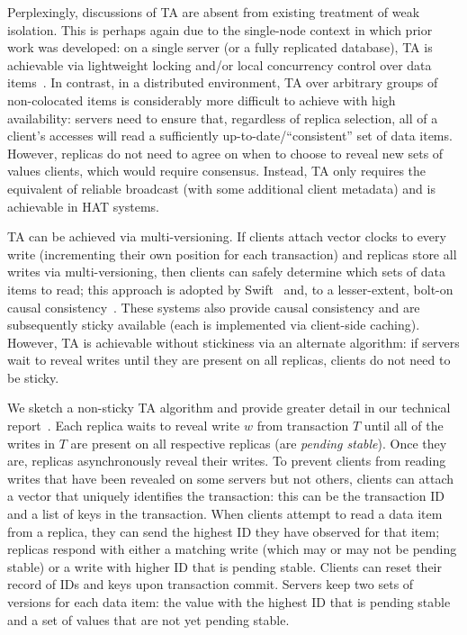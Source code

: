 Perplexingly, discussions of TA are absent from existing treatment of
weak isolation. This is perhaps again due to the single-node context
in which prior work was developed: on a single server (or a fully
replicated database), TA is achievable via lightweight locking and/or
local concurrency control over data items~\cite{gstore}. In contrast,
in a distributed environment, TA over arbitrary groups of
non-colocated items is considerably more difficult to achieve with
high availability: servers need to ensure that, regardless of replica
selection, all of a client's accesses will read a sufficiently
up-to-date/``consistent'' set of data items. However, replicas do not
need to agree on when to choose to reveal new sets of values clients,
which would require consensus. Instead, TA only requires the
equivalent of reliable broadcast (with some additional client
metadata) and is achievable in HAT systems.

TA can be achieved via multi-versioning. If clients attach vector
clocks to every write (incrementing their own position for each
transaction) and replicas store all writes via multi-versioning, then
clients can safely determine which sets of data items to read; this
approach is adopted by Swift~\cite{swift} and, to a lesser-extent,
bolt-on causal consistency~\cite{bolton}. These systems also provide
causal consistency and are subsequently sticky available (each is
implemented via client-side caching). However, TA is achievable
without stickiness via an alternate algorithm: if servers wait to
reveal writes until they are present on all replicas, clients do not
need to be sticky.

We sketch a non-sticky TA algorithm and provide greater detail in our
technical report~\cite{hat-tr}. Each replica waits to reveal write $w$
from transaction $T$ until all of the writes in $T$ are present on all
respective replicas (are \textit{pending stable}). Once they are,
replicas asynchronously reveal their writes. To prevent clients from
reading writes that have been revealed on some servers but not others,
clients can attach a vector that uniquely identifies the transaction:
this can be the transaction ID and a list of keys in the
transaction. When clients attempt to read a data item from a replica,
they can send the highest ID they have observed for that item;
replicas respond with either a matching write (which may or may not be
pending stable) or a write with higher ID that is pending
stable. Clients can reset their record of IDs and keys upon
transaction commit. Servers keep two sets of versions for each data
item: the value with the highest ID that is pending stable and a set
of values that are not yet pending stable.

